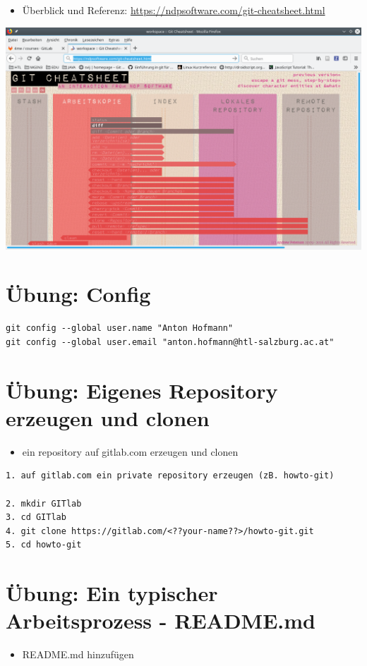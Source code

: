 \documentclass[11pt]{article}
\begin{document}
\begin{itemize}
\item Überblick und Referenz: \url{https://ndpsoftware.com/git-cheatsheet.html}
\end{itemize}

\begin{center}
\includegraphics[width=.9\linewidth]{./img/git-overview.png}
\end{center}


\section{Übung: Config}
\label{sec:org16af1bf}

\begin{verbatim}
git config --global user.name "Anton Hofmann"
git config --global user.email "anton.hofmann@htl-salzburg.ac.at"
\end{verbatim}


\section{Übung: Eigenes Repository erzeugen und clonen}
\label{sec:org9059db0}
\begin{itemize}
\item ein repository auf gitlab.com erzeugen und clonen
\end{itemize}

\begin{verbatim}
1. auf gitlab.com ein private repository erzeugen (zB. howto-git)

2. mkdir GITlab
3. cd GITlab
4. git clone https://gitlab.com/<??your-name??>/howto-git.git
5. cd howto-git
\end{verbatim}


\section{Übung: Ein typischer Arbeitsprozess - README.md}
\label{sec:org98bc622}
\begin{itemize}
\item README.md hinzufügen
\end{itemize}
\end{document}
